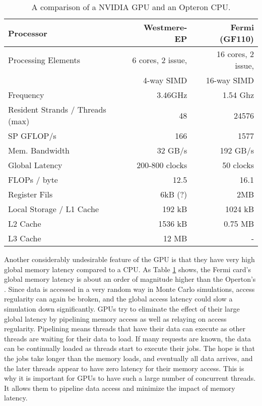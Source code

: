 \begin{table}[h]
\centering
\caption{A comparison of a NVIDIA GPU and an Opteron CPU.}
\label{gpu_cpu_comp}
\begin{tabular}{| l | r | r |}
\hline
Processor & Westmere-EP & Fermi (GF110) \\
\hline
\hline
Processing Elements & 6 cores, 2 issue, & 16 cores, 2 issue, \\
& 4-way SIMD &  16-way SIMD  \\
\hline
Frequency & 3.46GHz &  1.54 Ghz \\
\hline
Resident Strands / Threads (max) & 48 & 24576 \\
\hline
SP GFLOP/s & 166 & 1577 \\
\hline
Mem. Bandwidth &  32 GB/s & 192 GB/s \\
\hline
Global Latency & 200-800 clocks & ~50 clocks \\
\hline
FLOPs / byte & 12.5  & 16.1 \\
\hline
Register Fils & 6kB (?) & 2MB \\
\hline
Local Storage / L1 Cache & 192 kB & 1024 kB \\
\hline
L2 Cache & 1536 kB & 0.75 MB \\
\hline
L3 Cache & 12 MB & - \\
\hline
\end{tabular}
\end{table}

Another considerably undesirable feature of the GPU is that they have very high global memory latency compared to a CPU.  As Table \ref{gpu_cpu_comp} shows, the Fermi card's global memory latency is about an order of magnitude higher than the Operton's \cite{cpu_latency,cuda}.  Since data is accessed in a very random way in Monte Carlo simulations, access regularity can again be broken, and the global access latency could slow a simulation down significantly.  GPUs try to eliminate the effect of their large global latency by pipelining memory access as well as relaying on access regularity.  Pipelining means threads that have their data can execute as other threads are waiting for their data to load.  If many requests are known, the data can be continually loaded as threads start to execute their jobs.  The hope is that the jobs take longer than the memory loads, and eventually all data arrives, and the later threads appear to have zero latency for their memory access.  This is why it is important for GPUs to have such a large number of concurrent threads.  It allows them to pipeline data access and minimize the impact of memory latency.


